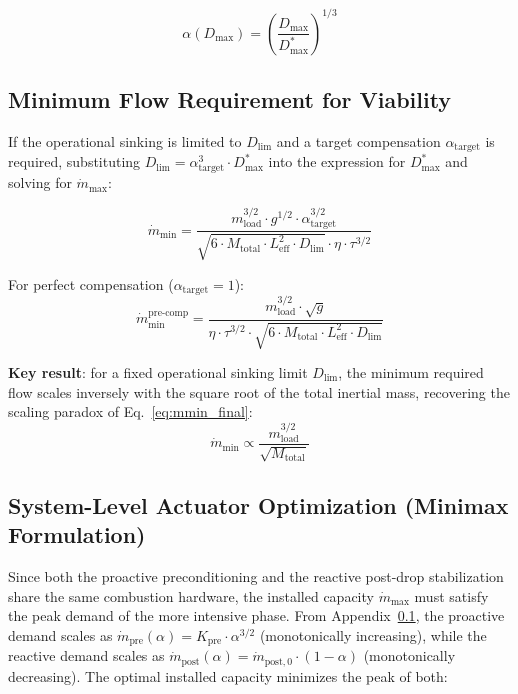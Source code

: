 \begin{equation}
  \boxed{\alpha(D_{\max}) = \left(\frac{D_{\max}}{D_{\max}^*}\right)^{1/3}}
\end{equation}

\subsection{Minimum Flow Requirement for Viability}
\label{appx:mmin_viability}

If the operational sinking is limited to $D_{\text{lim}}$ and a target compensation $\alpha_{\text{target}}$ is required, substituting $D_{\text{lim}} = \alpha_{\text{target}}^3 \cdot D_{\max}^*$ into the expression for $D_{\max}^*$ and solving for $\dot{m}_{\text{max}}$:

\begin{equation}
  \boxed{\dot{m}_{\text{min}} = \frac{m_{\text{load}}^{3/2} \cdot g^{1/2} \cdot \alpha_{\text{target}}^{3/2}}{\sqrt{6 \cdot M_{\text{total}} \cdot L_{\text{eff}}^2 \cdot D_{\text{lim}}} \cdot \eta \cdot \tau^{3/2}}}
\end{equation}

For perfect compensation ($\alpha_{\text{target}} = 1$):
\begin{equation}
  \boxed{\dot{m}_{\text{min}}^{\text{pre-comp}} = \frac{m_{\text{load}}^{3/2} \cdot \sqrt{g}}{\eta \cdot \tau^{3/2} \cdot \sqrt{6 \cdot M_{\text{total}} \cdot L_{\text{eff}}^2 \cdot D_{\text{lim}}}}}
\end{equation}

\textbf{Key result}: for a fixed operational sinking limit $D_{\text{lim}}$, the minimum required flow scales inversely with the square root of the total inertial mass, recovering the scaling paradox of Eq.~\eqref{eq:mmin_final}:
\begin{equation}
  \dot{m}_{\text{min}} \propto \frac{m_{\text{load}}^{3/2}}{\sqrt{M_{\text{total}}}}
\end{equation}

\subsection{System-Level Actuator Optimization (Minimax Formulation)}
\label{appx:system_optimization}

Since both the proactive preconditioning and the reactive post-drop stabilization share the same combustion hardware, the installed capacity $\dot{m}_{\text{max}}$ must satisfy the peak demand of the more intensive phase. From Appendix~\ref{appx:mmin_viability}, the proactive demand scales as $\dot{m}_{\text{pre}}(\alpha) = K_{\text{pre}} \cdot \alpha^{3/2}$ (monotonically increasing), while the reactive demand scales as $\dot{m}_{\text{post}}(\alpha) = \dot{m}_{\text{post},0} \cdot (1-\alpha)$ (monotonically decreasing). The optimal installed capacity minimizes the peak of both:

